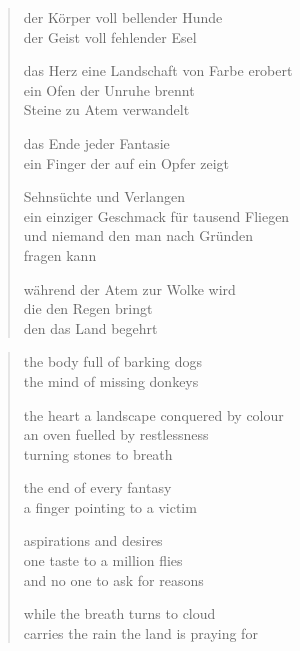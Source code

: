 
\cleartorecto


\begin{verse}

der Körper voll bellender Hunde\\
der Geist voll fehlender Esel

das Herz eine Landschaft von Farbe erobert\\
ein Ofen der Unruhe brennt\\
Steine zu Atem verwandelt

das Ende jeder Fantasie\\
ein Finger der auf ein Opfer zeigt

Sehnsüchte und Verlangen\\
ein einziger Geschmack für tausend Fliegen\\
und niemand den man nach Gründen\\
fragen kann

während der Atem zur Wolke wird\\
die den Regen bringt\\
den das Land begehrt

\end{verse}

\cleartoverso


\begin{verse}

the body full of barking dogs\\
the mind of missing donkeys

the heart a landscape conquered by colour\\
an oven fuelled by restlessness\\
turning stones to breath

the end of every fantasy\\
a finger pointing to a victim

aspirations and desires\\
one taste to a million flies\\
and no one to ask for reasons

while the breath turns to cloud\\
carries the rain the land is praying for

\end{verse}

